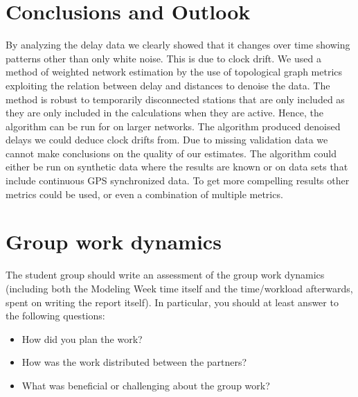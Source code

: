 \documentclass[12pt, sumlimits, intlimits]{article}
\begin{document}
\section{Conclusions and Outlook}
By analyzing the delay data we clearly showed that it changes over time showing patterns other than only white noise. This is due to clock drift. We used a method of weighted network estimation by the use of
topological graph metrics exploiting the relation between delay and distances to denoise the data. The method is robust to temporarily disconnected stations that are only included as they are only included in the calculations when they are active. Hence, the algorithm can be run for on larger networks. The algorithm produced denoised delays we could deduce clock drifts from. Due to missing validation data we cannot make conclusions on the quality of our estimates. The algorithm could either be run on synthetic data where the results are known or on data sets that include continuous GPS synchronized data. To get more compelling results other metrics could be used, or even a combination of multiple metrics.


\section{Group work dynamics}

The student group should write an assessment of the group work dynamics
(including both the Modeling Week time itself and the time/workload afterwards,
spent on writing the report itself). In particular, you should at least answer
to the following questions:
\begin{itemize}
\item How did you plan the work?
\item How was the work distributed between the partners?
\item What was beneficial or challenging about the group work?
\end{itemize}
\end{document}
